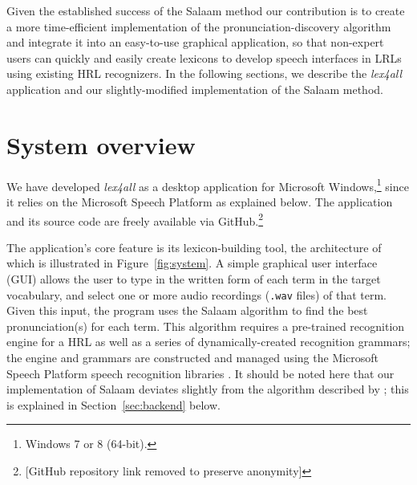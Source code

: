 \documentclass[11pt]{article}
\begin{document}
Given the established success of the Salaam method 
our contribution is to create a more time-efficient implementation of the pronunciation-discovery algorithm and integrate it into an easy-to-use graphical application, so that non-expert users can quickly and easily create lexicons to develop speech interfaces in LRLs using existing HRL recognizers. In the following sections, we describe the \textit{lex4all} application and our slightly-modified implementation of the Salaam method.


\section{System overview}
\label{sec:overview}

We have developed \textit{lex4all} as a desktop application for Microsoft Windows,\footnote{Windows 7 or 8 (64-bit).} since it relies on the Microsoft Speech Platform \cite{mspsdk} as explained below.
The application and its source code are freely available 
via GitHub.\footnote{[GitHub repository link removed to preserve anonymity]} 


The application's core feature is its lexicon-building tool, the architecture of which is illustrated in Figure~\ref{fig:system}.
A simple graphical user interface (GUI) allows the user to type in the written form of each term in the target vocabulary, and select one or more audio recordings (\texttt{.wav} files) of that term.
Given this input, the program uses the Salaam algorithm \cite{Qiao10,Chan12} to find the best pronunciation(s) for each term. This algorithm requires a pre-trained recognition engine for a HRL 
as well as a series of dynamically-created recognition grammars; the engine and grammars are constructed and managed using the Microsoft Speech Platform speech recognition libraries \cite{mspsdk}.
It should be noted here that 
our implementation of Salaam deviates slightly from the algorithm described by ; this is explained in Section~\ref{sec:backend} below. 
\end{document}
